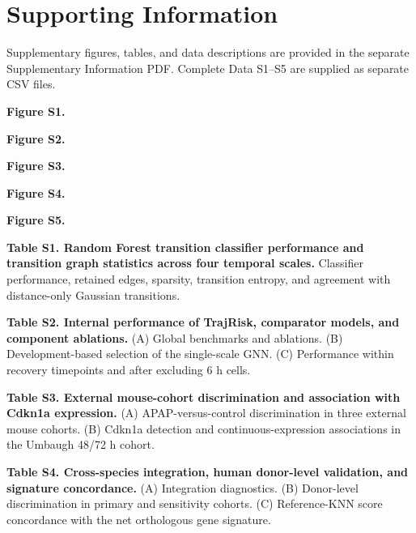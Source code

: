 \clearpage\onecolumn\section*{Supporting Information}
\noindent Supplementary figures, tables, and data descriptions are provided in the separate Supplementary Information PDF. Complete Data S1--S5 are supplied as separate CSV files.\par\medskip
{}\noindent\textbf{Figure S1.} \FigSOneTitle{}\par\medskip
{}\noindent\textbf{Figure S2.} \FigSTwoTitle{}\par\medskip
{}\noindent\textbf{Figure S3.} \FigSThreeTitle{}\par\medskip
{}\noindent\textbf{Figure S4.} \FigSFourTitle{}\par\medskip
{}\noindent\textbf{Figure S5.} \FigSFiveTitle{}\par\medskip
{}
\noindent\textbf{Table S1. Random Forest transition classifier performance and transition graph statistics across four temporal scales.} Classifier performance, retained edges, sparsity, transition entropy, and agreement with distance-only Gaussian transitions.\par\medskip
{}
\noindent\textbf{Table S2. Internal performance of TrajRisk, comparator models, and component ablations.} (A) Global benchmarks and ablations. (B) Development-based selection of the single-scale GNN. (C) Performance within recovery timepoints and after excluding 6 h cells.\par\medskip
{}
\noindent\textbf{Table S3. External mouse-cohort discrimination and association with Cdkn1a expression.} (A) APAP-versus-control discrimination in three external mouse cohorts. (B) Cdkn1a detection and continuous-expression associations in the Umbaugh 48/\allowbreak{}72 h cohort.\par\medskip
{}
\noindent\textbf{Table S4. Cross-species integration, human donor-level validation, and signature concordance.} (A) Integration diagnostics. (B) Donor-level discrimination in primary and sensitivity cohorts. (C) Reference-KNN score concordance with the net orthologous gene signature.\par\medskip
